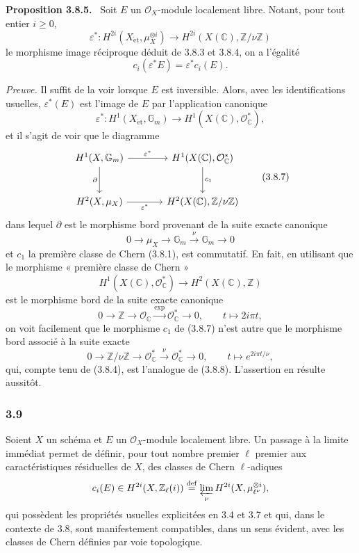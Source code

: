 \documentclass[11pt]{article}
\newenvironment{statement}[1]{\par\medskip\noindent\textbf{#1.}\ }{\par\medskip}
\providecommand{\et}{\mathrm{\acute{e}t}}
\providecommand{\et}{\acute{e}t}
\begin{document}
\begin{statement}{Proposition 3.8.5}
Soit $E$ un $\mathcal O_X$-module localement libre. Notant, pour tout entier $i\ge0$,
\[
\varepsilon^*:H^{2i}(X_{\et},\mu_X^{\otimes i})
\to H^{2i}(X(\mathbb C),\mathbb Z/\nu\mathbb Z)
\]
le morphisme image réciproque déduit de 3.8.3 et 3.8.4, on a l'égalité
\[
c_i(\varepsilon^*E)=\varepsilon^*c_i(E).
\]
\end{statement}

\emph{Preuve.} Il suffit de la voir lorsque $E$ est inversible. Alors, avec les identifications usuelles, $\varepsilon^*(E)$ est l'image de $E$ par l'application canonique
\[
\varepsilon^*:H^1(X_{\et},\mathbb G_m)\to H^1(X(\mathbb C),\mathcal O_\mathbb C^*),
\tag{3.8.6}
\]
et il s'agit de voir que le diagramme
\[
\begin{tikzcd}[column sep=large,row sep=large]
H^1(X,\mathbb G_m) \arrow[r,"\varepsilon^*"] \arrow[d,"\partial"'] &
H^1(X(\mathbb C),\mathcal O_\mathbb C^*) \arrow[d,"c_1"]\\
H^2(X,\mu_X) \arrow[r,"\varepsilon^*"'] &
H^2(X(\mathbb C),\mathbb Z/\nu\mathbb Z)
\end{tikzcd}
\tag{3.8.7}
\]
dans lequel $\partial$ est le morphisme bord provenant de la suite exacte canonique
\[
0\to \mu_X\to\mathbb G_m\xrightarrow{\nu}\mathbb G_m\to0
\tag{3.8.8}
\]
et $c_1$ la première classe de Chern (3.8.1), est commutatif. En fait, en utilisant que le morphisme « première classe de Chern »
\[
H^1(X(\mathbb C),\mathcal O_\mathbb C^*)\to H^2(X(\mathbb C),\mathbb Z)
\]
est le morphisme bord de la suite exacte canonique
\[
0\to\mathbb Z\to\mathcal O_\mathbb C\xrightarrow{\exp}\mathcal O_\mathbb C^*\to0,
\qquad
t\mapsto 2i\pi t,
\]
on voit facilement que le morphisme $c_1$ de (3.8.7) n'est autre que le morphisme bord associé à la suite exacte
\[
0\to\mathbb Z/\nu\mathbb Z\to\mathcal O_\mathbb C^*\xrightarrow{\nu}\mathcal O_\mathbb C^*\to0,
\qquad
t\mapsto e^{2i\pi t/\nu},
\]
qui, compte tenu de (3.8.4), est l'analogue de (3.8.8). L'assertion en résulte aussitôt.

\subsubsection*{3.9}
Soient $X$ un schéma et $E$ un $\mathcal O_X$-module localement libre. Un passage à la limite immédiat permet de définir, pour tout nombre premier $\ell$ premier aux caractéristiques résiduelles de $X$, des classes de Chern $\ell$-adiques
\[
c_i(E)\in H^{2i}(X,\mathbb Z_\ell(i))
\stackrel{\mathrm{def}}{=}\varprojlim_\nu H^{2i}(X,\mu_{\ell^\nu}^{\otimes i}),
\]
qui possèdent les propriétés usuelles explicitées en 3.4 et 3.7 et qui, dans le contexte de 3.8, sont manifestement compatibles, dans un sens évident, avec les classes de Chern définies par voie topologique.
\end{document}
